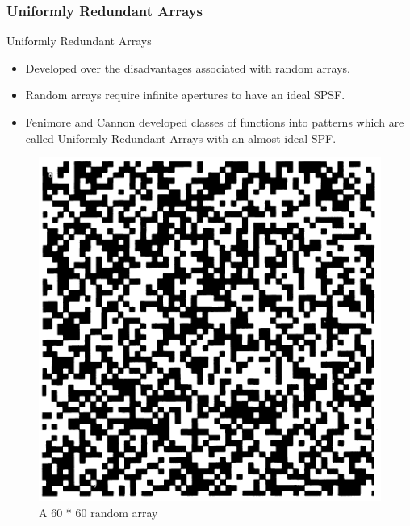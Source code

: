 \documentclass{beamer}
\begin{document}
\subsubsection[]{Uniformly Redundant Arrays}
\begin{frame}{Uniformly Redundant Arrays}
\begin{itemize}
\item Developed over the disadvantages associated with random arrays. 
\item Random arrays require infinite apertures to have an ideal SPSF.
\item Fenimore and Cannon developed classes of functions into patterns which are called Uniformly Redundant Arrays with an almost ideal SPF\cite{Fenimore:78}.
\end{itemize}
\begin{figure}{
\includegraphics[scale=0.125]{doc_images/lensless_4.PNG}
\caption{A 60 * 60 random array}}
\end{figure}
\end{frame}
\end{document}
